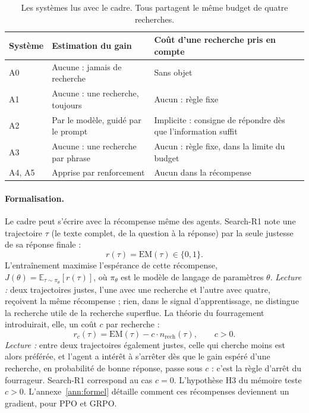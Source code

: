 \documentclass[11pt,a4paper]{article}
\begin{document}
\begin{table}[ht]
\centering\small
\begin{tabular}{@{}lp{5.6cm}p{5.6cm}@{}}
\toprule
Système & Estimation du gain & Coût d'une recherche pris en compte\\
\midrule
A0 & Aucune : jamais de recherche & Sans objet\\
A1 & Aucune : une recherche, toujours & Aucun : règle fixe\\
A2 & Par le modèle, guidé par le prompt & Implicite : consigne de répondre dès que l'information suffit\\
A3 & Aucune : une recherche par phrase & Aucun : règle fixe, dans la limite du budget\\
A4, A5 & Apprise par renforcement & Aucun dans la récompense\\
\bottomrule
\end{tabular}
\caption{Les systèmes lus avec le cadre. Tous partagent le même budget de quatre recherches.}
\label{tab:cadre}
\end{table}

\paragraph{Formalisation.} Le cadre peut s'écrire avec la récompense même des agents. Search-R1 note une trajectoire $\tau$ (le texte complet, de la question à la réponse) par la seule justesse de sa réponse finale \citep{jin2025search} :
\begin{equation}\label{eq:r-searchr1}
r(\tau) = \mathrm{EM}(\tau) \in \{0, 1\}.
\end{equation}
L'entraînement maximise l'espérance de cette récompense, $J(\theta) = \mathbb{E}_{\tau \sim \pi_\theta}[r(\tau)]$, où $\pi_\theta$ est le modèle de langage de paramètres $\theta$. \emph{Lecture :} deux trajectoires justes, l'une avec une recherche et l'autre avec quatre, reçoivent la même récompense ; rien, dans le signal d'apprentissage, ne distingue la recherche utile de la recherche superflue. La théorie du fourragement introduirait, elle, un coût $c$ par recherche :
\begin{equation}\label{eq:r-cout}
r_c(\tau) = \mathrm{EM}(\tau) - c \cdot n_{\text{rech}}(\tau), \qquad c > 0.
\end{equation}
\emph{Lecture :} entre deux trajectoires également justes, celle qui cherche moins est alors préférée, et l'agent a intérêt à s'arrêter dès que le gain espéré d'une recherche, en probabilité de bonne réponse, passe sous $c$ : c'est la règle d'arrêt du fourrageur. Search-R1 correspond au cas $c = 0$. L'hypothèse H3 du mémoire teste $c > 0$. L'annexe~\ref{ann:formel} détaille comment ces récompenses deviennent un gradient, pour PPO et GRPO.
\end{document}
